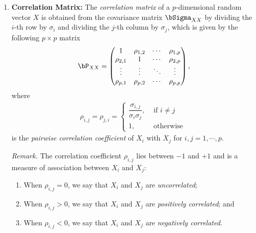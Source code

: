 \documentclass[12pt]{article}
\begin{document}
\begin{enumerate}[label=\textbf{\arabic*.}]
	\item \textbf{Correlation Matrix:} The \textit{correlation matrix} of a $p$-dimensional random vector $X$ is obtained from the covariance matrix $\bSigma_{XX}$ by dividing the $i$-th row by $\sigma_i$ and dividing the $j$-th column by $\sigma_j$, which is given by the following $p \times p$ matrix 
	\begin{align*}
		\bP_{XX} = \begin{pmatrix}
			1 & \rho_{1,2} & \cdots & \rho_{1,p} \\ 
			\rho_{2,1} & 1 & \cdots & \rho_{2,p} \\ 
			\vdots & \vdots & \ddots & \vdots \\
			\rho_{p,1} & \rho_{p,2} & \cdots & \rho_{p,p}
		\end{pmatrix}, 
	\end{align*}
	where 
	\begin{align*}
		\rho_{i,j} = \rho_{j,i} = \begin{cases}
		\dfrac{\sigma_{i,j}}{\sigma_i \sigma_j}, & \text{ if } i \ne j \\
		1,  & \text{ otherwise }
		\end{cases} 
	\end{align*}
	is the \textit{pairwise correlation coefficient} of $X_i$ with $X_j$ for $i, j = 1, \cdots, p$. 
	
	\textit{Remark.} The correlation coefficient $\rho_{i,j}$ lies between $-1$ and $+1$ and is a measure of association between $X_i$ and $X_j$: 
	\begin{enumerate}
		\item When $\rho_{i,j} = 0$, we say that $X_i$ and $X_j$ are \emph{uncorrelated}; 
		\item When $\rho_{i,j} > 0$, we say that $X_i$ and $X_j$ are \emph{positively correlated}; and 
		\item When $\rho_{i,j} < 0$, we say that $X_i$ and $X_j$ are \emph{negatively correlated}. 
	\end{enumerate}
	

\end{enumerate}
\end{document}
